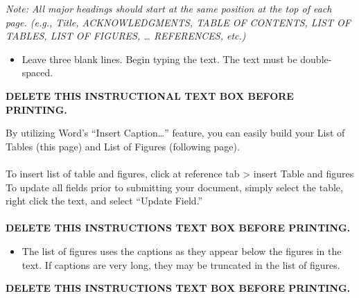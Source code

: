 \documentclass[a4paper,12pt,one side]{report}
\theoremstyle{definition}
\begin{document}
\begin{tcolorbox}[enhanced jigsaw,
    sharp corners,
    boxrule=0.5pt, 
    colback=blue!30!white,   
    borderline={0.5pt}{-2pt}{black,solid} %
 ]
 \begin{justify}
 \emph{Note: All major headings should start at the same position at the top of each page. (e.g., Title, ACKNOWLEDGMENTS, TABLE OF CONTENTS, LIST OF TABLES, LIST OF FIGURES, … REFERENCES, etc.)}
\begin{itemize}
    \item Leave three blank lines. Begin typing the text. The text must be double-spaced.
\end{itemize}
\bf {DELETE THIS INSTRUCTIONAL TEXT BOX BEFORE PRINTING.}
\end{justify}
\end{tcolorbox}


\newpage
\tableofcontents
\listoftables
{}
\begin{tcolorbox}[enhanced jigsaw,
    sharp corners,
    boxrule=0.5pt, 
    colback=blue!30!white,   
    borderline={0.5pt}{-2pt}{black,solid} %
 ]
\begin{justify}
By utilizing Word’s “Insert Caption…” feature, you can easily build your List of Tables (this page) and List of Figures (following page). \\~\\ 
To insert list of table and figures, click at reference tab > insert Table and figures
To update all fields prior to submitting your document, simply select the table, right click the text, and select “Update Field.”\\~\\
{\bf DELETE THIS INSTRUCTIONS TEXT BOX BEFORE PRINTING.}
\end{justify}
\end{tcolorbox}

\pagebreak
\listoffigures
{}
\begin{tcolorbox}[enhanced jigsaw,
    sharp corners,
    boxrule=0.5pt, 
    colback=blue!30!white,   
    borderline={0.5pt}{-2pt}{black,solid} %
 ]
 \begin{justify}
     \begin{itemize}
    \item The list of figures uses the captions as they appear below the figures in the text. If captions are very long, they may be truncated in the list of figures.
    \end{itemize}\vspace{1cm}
{\bf DELETE THIS INSTRUCTIONS TEXT BOX BEFORE PRINTING.}
\end{justify}
\end{tcolorbox}
\newpage
{}
\end{document}
